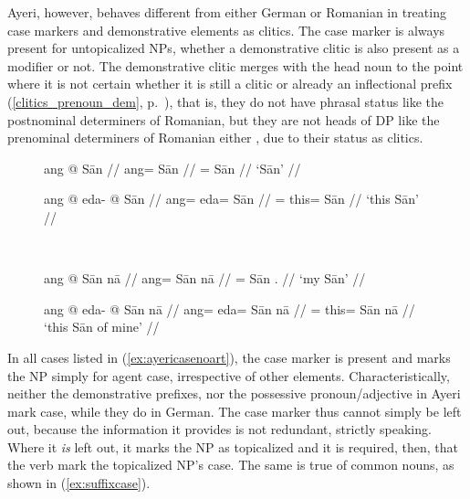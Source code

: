 Ayeri, however, behaves different from either German or
Romanian in treating case markers and demonstrative elements as
clitics. The case marker is always present for
untopicalized NPs, whether a demonstrative clitic is also present as a
modifier or not. The demonstrative clitic merges with the head
noun to the point where it is not certain whether it is still a
clitic or already an inflectional prefix
(\autoref{clitics_prenoun_dem}, p.~\pageref{clitics_prenoun_dem}), that is, they
do not have phrasal status like the postnominal determiners of
Romanian, but they are not heads of DP like the prenominal
determiners of Romanian either \citep[299]{dindelegan2013}, due
to their status as clitics.

\begin{figure}
\ex{}\label{ex:ayericasenoart}%
\begin{minipage}[t]{.5\remaining}%
	\tl\quad\begingl
		\gla ang @ Sān //
		\glb ang= Sān //
		\glc \Aarg{}= Sān //
		\glft `Sān' //
	\endgl\medskip

	\tl\quad\begingl
		\gla ang @ eda- @ Sān //
		\glb ang= eda= Sān //
		\glc \Aarg{}= this= Sān //
		\glft `this Sān' //
	\endgl
\end{minipage}
~
\begin{minipage}[t]{.5\remaining}%
	\tl\quad\label{ex:naaadj}\begingl
		\gla ang @ Sān nā //
		\glb ang= Sān nā //
		\glc \Aarg{}= Sān \Fsg{}.\Gen{} //
		\glft `my Sān' //
	\endgl\medskip

	\tl\quad\ljudge\ques\begingl
		\gla ang @ eda- @ Sān nā //
		\glb ang= eda= Sān nā //
		\glc \Aarg{}= this= Sān nā //
		\glft `this Sān of mine' //
	\endgl
\end{minipage}
\xe
\end{figure}

In all cases listed in (\ref{ex:ayericasenoart}), the case marker is present
and marks the NP simply for agent case, irrespective of other elements.
Characteristically, neither the demonstrative prefixes, nor the possessive
pronoun/adjective in Ayeri mark case, while they do in German. The case marker
thus cannot simply be left out, because the information it provides is not
redundant, strictly speaking. Where it \emph{is} left out, it marks the NP as
topicalized and it is required, then, that the verb mark the topicalized NP's
case. The same is true of common nouns, as shown in (\ref{ex:suffixcase}).

